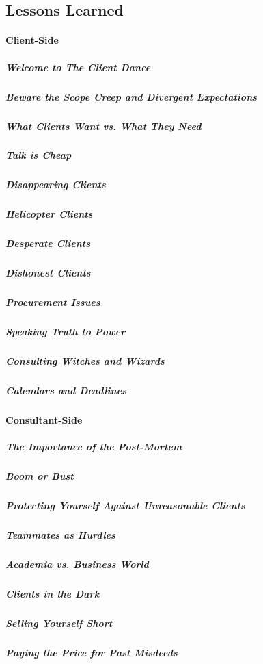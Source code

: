 \subsection{Lessons Learned}
\paragraph{Client-Side}
\subparagraph{Welcome to The Client Dance}
\subparagraph{Beware the Scope Creep and Divergent Expectations}
\subparagraph{What Clients Want vs. What They Need}
\subparagraph{Talk is Cheap}
\subparagraph{Disappearing Clients}
\subparagraph{Helicopter Clients}
\subparagraph{Desperate Clients}
\subparagraph{Dishonest Clients}
\subparagraph{Procurement Issues}
\subparagraph{Speaking Truth to Power}
\subparagraph{Consulting Witches and Wizards}
\subparagraph{Calendars and Deadlines}
\paragraph{Consultant-Side}
\subparagraph{The Importance of the Post-Mortem}
\subparagraph{Boom or Bust}
\subparagraph{Protecting Yourself Against Unreasonable Clients}
\subparagraph{Teammates as Hurdles}
\subparagraph{Academia vs. Business World}
\subparagraph{Clients in the Dark}
\subparagraph{Selling Yourself Short}
\subparagraph{Paying the Price for Past Misdeeds}

